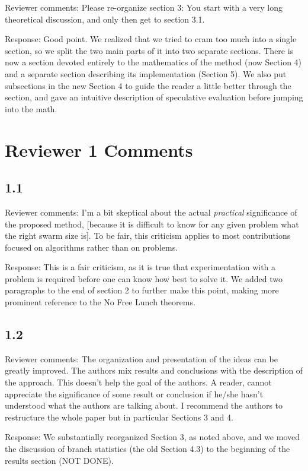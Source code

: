 \documentclass[onecolumn, 12pt]{article}
\begin{document}
Reviewer comments: Please re-organize section 3: You start with a very long
theoretical discussion, and only then get to section 3.1.

Response: Good point.  We realized that we tried to cram too much into a single
section, so we split the two main parts of it into two separate sections.
There is now a section devoted entirely to the mathematics of the method (now
Section 4) and a separate section describing its implementation (Section 5).
We also put subsections in the new Section 4 to guide the reader a little
better through the section, and gave an intuitive description of speculative
evaluation before jumping into the math.

\section*{Reviewer 1 Comments}

\subsection*{1.1}

Reviewer comments: I'm a bit skeptical about the actual \emph{practical}
significance of the proposed method, [because it is difficult to know for any
given problem what the right swarm size is]. To be fair, this criticism applies
to most contributions focused on algorithms rather than on problems.

Response: This is a fair criticism, as it is true that experimentation with a
problem is required before one can know how best to solve it.  We added two
paragraphs to the end of section 2 to further make this point, making more
prominent reference to the No Free Lunch theorems.

\subsection*{1.2}

Reviewer comments: The organization and presentation of the ideas can be
greatly improved. The authors mix results and conclusions with the description
of the approach. This doesn't help the goal of the authors. A reader, cannot
appreciate the significance of some result or conclusion if he/she hasn't
understood what the authors are talking about. I recommend the authors to
restructure the whole paper but in particular Sections 3 and 4.

Response: We substantially reorganized Section 3, as noted above, and we moved
the discussion of branch statistics (the old Section 4.3) to the beginning of
the results section (NOT DONE).
\end{document}

